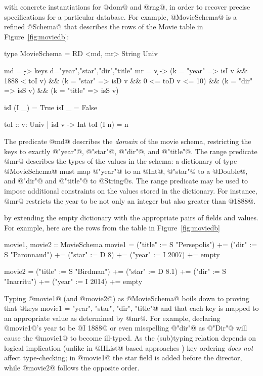  with concrete instantiations
for @dom@ and @rng@, in order to recover precise 
specifications for a particular database. For example, 
@MovieSchema@ is a refined @Schema@ that describes the 
rows of the Movie table in Figure~\ref{fig:moviedb}:
%
%
\begin{code}
  type MovieSchema = RD <md, mr> String Univ

  md = \d -> keys d={"year","star","dir","title"}
  mr = \k v -> 
       (k = "year"  => isI v && 1888 < toI v)
     && (k = "star"  => isD v && 0 <= toD v <= 10)
     && (k = "dir"   => isS v)
     && (k = "title" => isS v)

  isI (I _)   = True 
  isI _       = False 

  toI       :: {v: Univ | isI v} -> Int
  toI (I n) = n
\end{code}
%
The predicate @md@ describes the \emph{domain} of the movie schema,
restricting the keys to exactly @"year"@, @"star"@, @"dir"@, and @"title"@.
%
The range predicate @mr@ describes the types of the values in the schema:
%
a dictionary of type @MovieSchema@ must map 
@"year"@ to an @Int@,
@"star"@ to a @Double@, 
and @"dir"@ and @"title"@ to @String@s.
%
The range predicate may be used to impose additional constraints on the values
stored in the dictionary.
%
For instance, @mr@ restricts the year to be not only an integer but
also greater than @1888@.
%

 by extending the
empty dictionary with the appropriate pairs of fields and 
values. For example, here are the rows from the table
in Figure~\ref{fig:moviedb}
%
\begin{code}
  movie1, movie2 :: MovieSchema
  movie1 = ("title" := S "Persepolis")
        += ("dir"   := S "Paronnaud") 
        += ("star"  := D 8) 
        += ("year"  := I 2007) 
        += empty

  movie2 = ("title" := S "Birdman") 
        += ("star"  := D 8.1) 
        += ("dir"   := S "Inarritu")
        += ("year"  := I 2014) 
        += empty
\end{code}
%
Typing @movie1@ (and @movie2@) as @MovieSchema@
boils down to proving
%
that @keys movie1 = {"year", "star", "dir", "title"}@
and that each key is mapped to an appropriate value 
as determined by @mr@.
%
For example, declaring @movie1@'s year to be @I 1888@
or even misspelling @"dir"@ as @"Dir"@
will cause the @movie1@ to become ill-typed.
%
As the (sub)typing relation depends on logical 
implication (unlike in @HList@ based approaches 
\cite{heterogeneous}) key ordering \emph{does not} 
affect type-checking;
%
in @movie1@ the star field is added before the 
director, while @movie2@ follows the opposite order.

